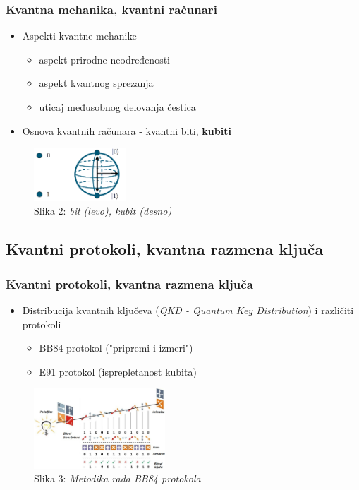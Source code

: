 \documentclass{beamer}
\begin{document}
\begin{frame}[fragile]\frametitle{Kvantna mehanika, kvantni računari}\bigskip
	\begin{itemize}	
		\item Aspekti kvantne mehanike
            \begin{itemize}
                \item aspekt prirodne neodređenosti
                \item aspekt kvantnog sprezanja
                \item uticaj međusobnog delovanja čestica
            \end{itemize}
		\item Osnova kvantnih računara - kvantni biti, \bf{kubiti}
	\end{itemize}
 \bigskip
        \begin{figure}[h!]
        \centering\includegraphics[height=2cm]{sl1.png} 
        \caption{Slika 2: \emph{bit (levo), kubit (desno)}}
        \label{fig:bitkubit}
        \end{figure}
 
\end{frame}

\subsection{Kvantni protokoli, kvantna razmena ključa}
\begin{frame}[fragile]\frametitle{Kvantni protokoli, kvantna razmena ključa}
\bigskip
	\begin{itemize}	
		\item Distribucija kvantnih ključeva (\textit{QKD - Quantum Key Distribution}) i različiti protokoli
        \begin{itemize}
            \item BB84 protokol ("pripremi i izmeri")
                
            \item E91 protokol (isprepletanost kubita)
            
        \end{itemize}
	\end{itemize}
 \smallskip
        \begin{figure}[h!]
        \centering\includegraphics[height=3cm]{bb84.jpg} 
        \caption{Slika 3: \emph{Metodika rada BB84 protokola}}
        \label{fig:bb84}
        \end{figure}
 
\end{frame}
\end{document}

